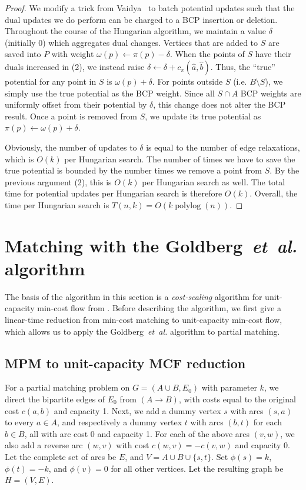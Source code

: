 \documentclass[11pt]{article}
\def\etal{\textsl{et~al.}}
\def\polylog{\mathop{\mathrm{polylog}}}
\def\fsupply{\phi}
\theoremstyle{plain}
\begin{document}
\begin{proof}
	We modify a trick from Vaidya~\cite{Vaidya89} to batch potential
	updates such that the dual updates we do perform can be charged to a
	BCP insertion or deletion.
	Throughout the course of the Hungarian algorithm, we maintain a value
	$\delta$ (initially 0) which aggregates dual changes.
	Vertices that are added to $S$ are saved into $P$ with weight
	$\omega(p) \gets \pi(p) - \delta$.
	When the points of $S$ have their duals increased in (2), we instead
	raise $\delta \gets \delta + c_\pi(\hat{a}, \hat{b})$.
	Thus, the ``true'' potential for any point in $S$ is
	$\omega(p) + \delta$.
	For points outside $S$ (i.e. $B \setminus S$), we simply use the true
	potential as the BCP weight.
	Since all $S \cap A$ BCP weights are uniformly offset from their
	potential by $\delta$, this change does not alter the BCP result.
	Once a point is removed from $S$, we update its true potential
	as $\pi(p) \gets \omega(p) + \delta$.

	Obviously, the number of updates to $\delta$ is equal to the number of
	edge relaxations, which is $O(k)$ per Hungarian search.
	The number of times we have to save the true potential is bounded by
	the number times we remove a point from $S$.
	By the previous argument (2), this is $O(k)$ per Hungarian search as
	well.
	The total time for potential updates per Hungarian search is therefore
	$O(k)$.
	Overall, the time per Hungarian search is $T(n, k) = O(k\polylog(n))$.
\end{proof}


\section{Matching with the Goldberg~{\etal} algorithm}
\label{section:goldberg}

The basis of the algorithm in this section is a \emph{cost-scaling} algorithm
for unit-capacity min-cost flow from \cite{GHKT17}.
Before describing the algorithm, we first give a linear-time reduction from
min-cost matching to unit-capacity min-cost flow, which allows us to apply the
Goldberg~{\etal} algorithm to partial matching.

\subsection{MPM to unit-capacity MCF reduction}
\label{subsection:mcm_mcf_reduction}

For a partial matching problem on $G = (A \cup B, E_0)$ with parameter $k$, we
direct the bipartite edges of $E_0$ from $(A \to B)$, with costs equal to the
original cost $c(a, b)$ and capacity 1.
Next, we add a dummy vertex $s$ with arcs $(s, a)$ to every $a \in A$,
and respectively a dummy vertex $t$ with arcs $(b, t)$ for each $b \in B$,
all with arc cost 0 and capacity 1.
For each of the above arcs $(v, w)$, we also add a reverse arc $(w, v)$ with
cost $c(w, v) = -c(v, w)$ and capacity 0.
Let the complete set of arcs be $E$, and $V = A \cup B \cup \{s, t\}$.
Set $\fsupply(s) = k$, $\fsupply(t) = -k$, and $\fsupply(v) = 0$ for all other
vertices.
Let the resulting graph be $H = (V, E)$.
\end{document}
